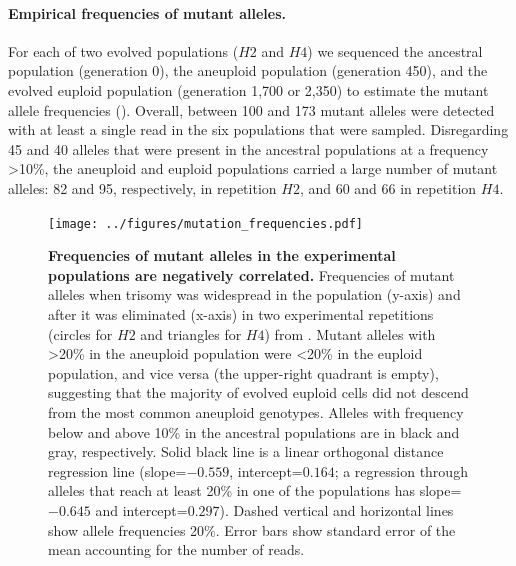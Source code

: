 \documentclass[12pt]{extarticle}
\begin{document}
\paragraph{Empirical frequencies of mutant alleles.} 
For each of two evolved populations ($H2$ and $H4$) we sequenced the ancestral population (generation 0), the aneuploid population (generation 450), and the evolved euploid population (generation 1,700 or 2,350) to estimate the mutant allele frequencies (). %
Overall, between 100 and 173 mutant alleles were detected with at least a single read in the six populations that were sampled. 
Disregarding 45 and 40 alleles that were present in the ancestral populations at a frequency >10\%, the aneuploid and euploid populations carried a large number of mutant alleles: 82 and 95, respectively, in repetition $H2$, and 60 and 66 in repetition $H4$.

\begin{figure}[h]
  \centering
    \texttt{[image: ../figures/mutation\_frequencies.pdf]}      
  \caption{
    \textbf{Frequencies of mutant alleles in the experimental populations are negatively correlated.} 
    Frequencies of mutant alleles when trisomy was widespread in the population (y-axis) and after it was eliminated (x-axis) in two experimental repetitions (circles for $H2$ and triangles for $H4$) from \citet{Yona2012}. Mutant alleles with >20\% in the aneuploid population were <20\% in the euploid population, and vice versa (the upper-right quadrant is empty), suggesting that the majority of evolved euploid cells did not descend from the most common aneuploid genotypes. 
Alleles with frequency below and above 10\% in the ancestral populations are in black and gray, respectively. 
Solid black line is a linear orthogonal distance regression line (slope=$-0.559$, intercept=$0.164$; a regression through alleles that reach at least 20\% in one of the populations has slope=$-0.645$ and intercept=$0.297$).
Dashed vertical and horizontal lines show allele frequencies 20\%. Error bars show standard error of the mean accounting for the number of reads.
}
  \label{fig:mutation_frequencies}
\end{figure}

\end{document}
